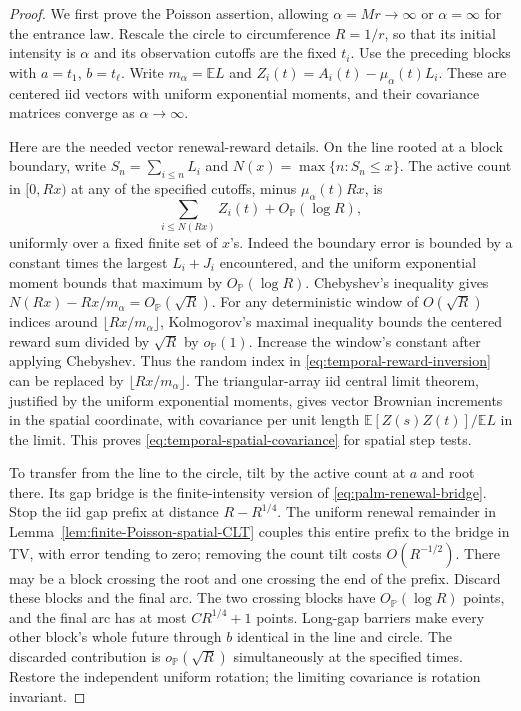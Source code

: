 \documentclass[11pt,letterpaper]{article}
\newcommand{\PP}{\mathbb P}\newcommand{\EE}{\mathbb E}
\begin{document}
\begin{proof}
We first prove the Poisson assertion, allowing $\alpha=Mr\to\infty$
or $\alpha=\infty$ for the entrance law. Rescale the circle to
circumference $R=1/r$, so that its initial intensity is
$\alpha$ and its observation cutoffs are the fixed $t_i$.
Use the preceding blocks with $a=t_1$, $b=t_\ell$.
Write $m_\alpha=\EE L$ and
$Z_i(t)=A_i(t)-\mu_\alpha(t)L_i$. These are centered iid vectors
with uniform exponential moments, and their covariance matrices
converge as $\alpha\to\infty$.

Here are the needed vector renewal-reward details. On the line
rooted at a block boundary, write
$S_n=\sum_{i\le n}L_i$ and $N(x)=\max\{n:S_n\le x\}$.
The active count in $[0,Rx)$ at any of the specified cutoffs,
minus $\mu_\alpha(t)Rx$, is
\begin{equation}\label{eq:temporal-reward-inversion}
 \sum_{i\le N(Rx)}Z_i(t)+O_{\PP}(\log R),
\end{equation}
uniformly over a fixed finite set of $x$'s. Indeed the boundary
error is bounded by a constant times the largest $L_i+J_i$
encountered, and the uniform exponential moment bounds that
maximum by $O_{\PP}(\log R)$. Chebyshev's inequality gives
$N(Rx)-Rx/m_\alpha=O_{\PP}(\sqrt R)$.
For any deterministic window of $O(\sqrt R)$ indices around
$\lfloor Rx/m_\alpha\rfloor$, Kolmogorov's maximal inequality
bounds the centered reward sum divided by $\sqrt R$ by
$o_{\PP}(1)$. Increase the window's constant after applying
Chebyshev. Thus the random index in
\eqref{eq:temporal-reward-inversion} can be replaced by
$\lfloor Rx/m_\alpha\rfloor$.
The triangular-array iid central limit theorem, justified by the
uniform exponential moments, gives vector Brownian increments
in the spatial coordinate, with covariance per unit length
$\EE[Z(s)Z(t)]/\EE L$ in the limit. This proves
\eqref{eq:temporal-spatial-covariance} for spatial step tests.

To transfer from the line to the circle, tilt by the active count
at $a$ and root there. Its gap bridge is the finite-intensity
version of \eqref{eq:palm-renewal-bridge}. Stop the iid gap
prefix at distance $R-R^{1/4}$. The uniform renewal remainder
in Lemma~\ref{lem:finite-Poisson-spatial-CLT} couples this entire
prefix to the bridge in TV, with error tending to zero; removing
the count tilt costs $O(R^{-1/2})$. There may be a block crossing
the root and one crossing the end of the prefix. Discard these
blocks and the final arc. The two crossing blocks have
$O_{\PP}(\log R)$ points, and the final arc has at most
$C R^{1/4}+1$ points. Long-gap barriers make every other block's
whole future through $b$ identical in the line and circle.
The discarded contribution is $o_{\PP}(\sqrt R)$ simultaneously
at the specified times. Restore the independent uniform rotation;
the limiting covariance is rotation invariant.


\end{proof}
\end{document}
